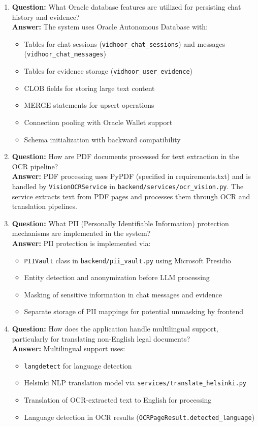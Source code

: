 \documentclass[11pt]{article}
\begin{document}
\begin{enumerate}
\item \textbf{Question:} What Oracle database features are utilized for persisting chat history and evidence?
\\ \textbf{Answer:} The system uses Oracle Autonomous Database with:
\begin{itemize}
\item Tables for chat sessions (\texttt{vidhoor\_chat\_sessions}) and messages (\texttt{vidhoor\_chat\_messages})
\item Tables for evidence storage (\texttt{vidhoor\_user\_evidence})
\item CLOB fields for storing large text content
\item MERGE statements for upsert operations
\item Connection pooling with Oracle Wallet support
\item Schema initialization with backward compatibility
\end{itemize}

\item \textbf{Question:} How are PDF documents processed for text extraction in the OCR pipeline?
\\ \textbf{Answer:} PDF processing uses PyPDF (specified in requirements.txt) and is handled by \texttt{VisionOCRService} in \texttt{backend/services/ocr\_vision.py}. The service extracts text from PDF pages and processes them through OCR and translation pipelines.

\item \textbf{Question:} What PII (Personally Identifiable Information) protection mechanisms are implemented in the system?
\\ \textbf{Answer:} PII protection is implemented via:
\begin{itemize}
\item \texttt{PIIVault} class in \texttt{backend/pii\_vault.py} using Microsoft Presidio
\item Entity detection and anonymization before LLM processing
\item Masking of sensitive information in chat messages and evidence
\item Separate storage of PII mappings for potential unmasking by frontend
\end{itemize}

\item \textbf{Question:} How does the application handle multilingual support, particularly for translating non-English legal documents?
\\ \textbf{Answer:} Multilingual support uses:
\begin{itemize}
\item \texttt{langdetect} for language detection
\item Helsinki NLP translation model via \texttt{services/translate\_helsinki.py}
\item Translation of OCR-extracted text to English for processing
\item Language detection in OCR results (\texttt{OCRPageResult.detected\_language})
\end{itemize}


\end{enumerate}
\end{document}
